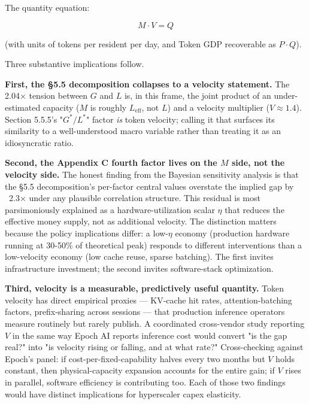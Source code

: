 \documentclass[11pt,a4paper]{article}
\begin{document}
The quantity equation:

\begin{equation*}
M \cdot V = Q
\end{equation*}

(with units of tokens per resident per day, and Token GDP recoverable as $P \cdot Q$).

Three substantive implications follow.

\textbf{First, the §5.5 decomposition collapses to a velocity statement.} The 2.04× tension between $G$ and $L$ is, in this frame, the joint product of an under-estimated capacity ($M$ is roughly $L_{\text{eff}}$, not $L$) and a velocity multiplier ($V \approx 1.4$). Section 5.5.5's "$G^{*}/L^{*}$" factor \emph{is} token velocity; calling it that surfaces its similarity to a well-understood macro variable rather than treating it as an idiosyncratic ratio.

\textbf{Second, the Appendix C fourth factor lives on the $M$ side, not the velocity side.} The honest finding from the Bayesian sensitivity analysis is that the §5.5 decomposition's per-factor central values overstate the implied gap by ~2.3× under any plausible correlation structure. This residual is most parsimoniously explained as a hardware-utilization scalar $\eta$ that reduces the effective money supply, not as additional velocity. The distinction matters because the policy implications differ: a low-$\eta$ economy (production hardware running at 30-50\% of theoretical peak) responds to different interventions than a low-velocity economy (low cache reuse, sparse batching). The first invites infrastructure investment; the second invites software-stack optimization.

\textbf{Third, velocity is a measurable, predictively useful quantity.} Token velocity has direct empirical proxies --- KV-cache hit rates, attention-batching factors, prefix-sharing across sessions --- that production inference operators measure routinely but rarely publish. A coordinated cross-vendor study reporting $V$ in the same way Epoch AI \cite{epoch2026inference} reports inference cost would convert "is the gap real?" into "is velocity rising or falling, and at what rate?" Cross-checking against Epoch's panel: if cost-per-fixed-capability halves every two months \cite{epoch2026inference} but $V$ holds constant, then physical-capacity expansion accounts for the entire gain; if $V$ rises in parallel, software efficiency is contributing too. Each of those two findings would have distinct implications for hyperscaler capex elasticity.
\end{document}
